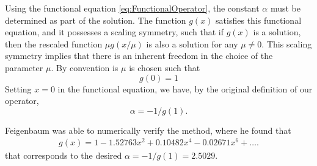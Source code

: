 Using the functional equation \eqref{eq:FunctionalOperator}, the constant $\alpha$ must be determined as part of the solution. 
The function $g(x)$ satisfies this functional equation, and it possesses a scaling symmetry, such that if $g(x)$ is a solution, then the rescaled function $\mu g(x/\mu)$ is also a solution for any $\mu \neq 0$. 
This scaling symmetry implies that there is an inherent freedom in the choice of the parameter $\mu$.
By convention is $\mu$ is chosen such that 
$$
g(0)=1
$$
Setting $x=0$ in the functional equation, we have, by the original definition  of our operator,
\begin{equation}\label{eq:alpha}
\alpha = -1/g(1).
\end{equation}

Feigenbaum was able to numerically verify the method, where he found that
\begin{align}
    g(x)= 1 - 1.52763x^2 + 0.10482x^4- 0.02671x^6 + \dots .\label{eq:feigenbaum}
\end{align}
that corresponds to the desired $\alpha =-1/g(1)=2.5029$.

